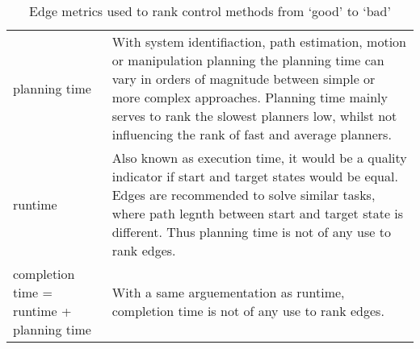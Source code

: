 \begin{table}[htb!]
\begin{tabular}[t]{p{3.7cm} p{10cm}}
planning time& With system identifiaction, path estimation, motion or manipulation planning the planning time can vary in orders of magnitude between simple or more complex approaches. Planning time mainly serves to rank the slowest planners low, whilst not influencing the rank of fast and average planners.\\
runtime& Also known as execution time, it would be a quality indicator if start and target states would be equal. Edges are recommended to solve similar tasks, where path legnth between start and target state is different. Thus planning time is not of any use to rank edges.\\
completion time = \newline runtime + planning time & With a same arguementation as runtime, completion time is not of any use to rank edges.\\
\end{tabular}
\caption{Edge metrics used to rank control methods from `good' to `bad'}
\label{table:review_edge_metrics}
\end{table}
